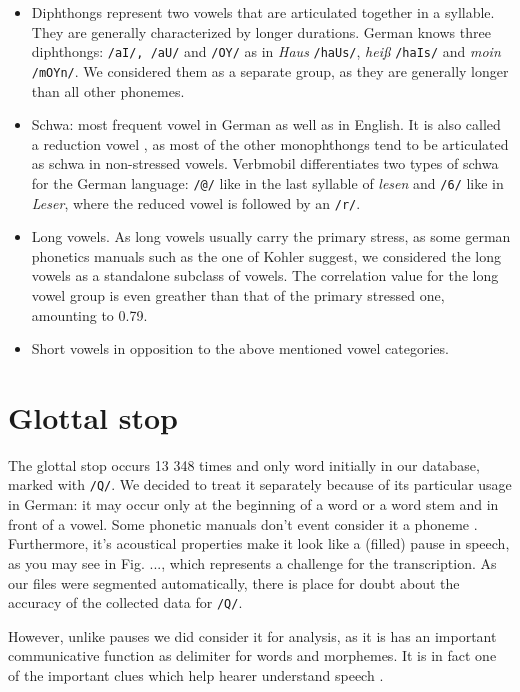 \documentclass[a4paper]{scrreprt}
\begin{document}
\begin{itemize}
	\item Diphthongs represent two vowels that are articulated together in a syllable. They are generally characterized by longer durations. German knows three diphthongs: \texttt{/aI/, /aU/} and \texttt{/OY/} as in \textit{Haus} \texttt{/haUs/},  \textit{heiß} \texttt{/haIs/} and \textit{moin} \texttt{/mOYn/}. We considered them as a separate group, as they are generally longer than all other phonemes.
	\item Schwa: most frequent vowel in German as well as in English. It is also called a reduction vowel \cite{Kohler1995}, as most of the other monophthongs tend to be articulated as schwa in non-stressed vowels. Verbmobil differentiates two types of schwa for the German language: \texttt{/@/} like in the last syllable of \textit{lesen} and \texttt{/6/} like in \textit{Leser}, where the reduced vowel is followed by an \texttt{/r/}.
	\item Long vowels. As long vowels usually carry the primary stress, as some german phonetics manuals such as the one of Kohler \cite{Kohler1995} suggest, we considered the long vowels as a standalone subclass of vowels. The correlation value for the long vowel group is even greather than that of the primary stressed one, amounting to 0.79.
	\item Short vowels in opposition to the above mentioned vowel categories.
\end{itemize}

\section{Glottal stop}
The glottal stop occurs 13 348 times and only word initially in our database, marked with \texttt{/Q/}. We decided to treat it separately because of its particular usage in German: it may occur only at the beginning of a word or a word stem and in front of a vowel. Some phonetic manuals don't event consider it a phoneme \cite{Ternes2012}. Furthermore, it's acoustical properties make it look like a (filled) pause in speech, as you may see in Fig. ..., which represents a challenge for the transcription. As our files were segmented automatically, there is place for doubt about the accuracy of the collected data for \texttt{/Q/}.

However, unlike pauses we did consider it  for analysis, as it is has an important communicative function as delimiter for words and morphemes. It is in fact one of the important clues which help hearer understand speech \cite{Ternes2012}. 
\end{document}
